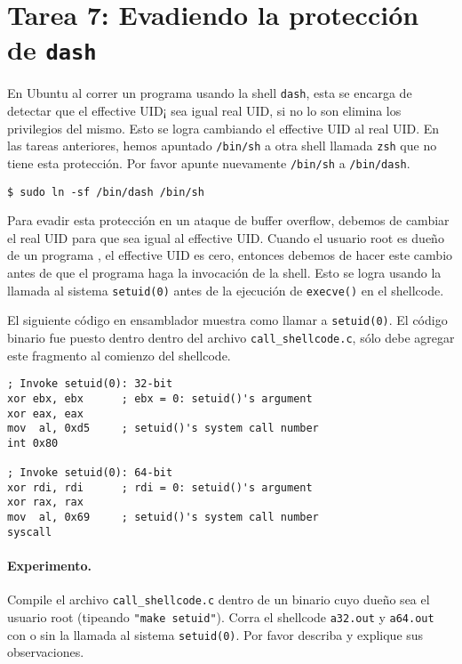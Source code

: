 \section{Tarea 7: Evadiendo la protección de \texttt{dash}}

En Ubuntu al correr un programa \setuid usando la shell \texttt{dash}, esta se encarga de detectar que el effective UID¡ sea igual real UID, si no lo son elimina los privilegios del mismo.
Esto se logra cambiando el effective UID al real UID.
En las tareas anteriores, hemos apuntado \texttt{/bin/sh} a otra shell llamada \texttt{zsh} que no tiene esta protección. Por favor apunte nuevamente \texttt{/bin/sh} a \texttt{/bin/dash}.

\begin{lstlisting}
$ sudo ln -sf /bin/dash /bin/sh
\end{lstlisting}

Para evadir esta protección en un ataque de buffer overflow, debemos de cambiar el real UID para que sea igual al effective UID. Cuando el usuario root es dueño de un programa \setuid, el effective UID es cero, entonces debemos de hacer este cambio antes de que el programa haga la invocación de la shell. Esto se logra usando la llamada al sistema \texttt{setuid(0)} antes de la ejecución de \texttt{execve()}  en el shellcode.

El siguiente código en ensamblador muestra como llamar a \texttt{setuid(0)}. El código binario fue puesto dentro dentro del archivo \texttt{call\_shellcode.c}, sólo debe agregar este fragmento al comienzo del shellcode.

\begin{lstlisting}[language={[x86masm]Assembler}]
; Invoke setuid(0): 32-bit
xor ebx, ebx      ; ebx = 0: setuid()'s argument
xor eax, eax
mov  al, 0xd5     ; setuid()'s system call number
int 0x80

; Invoke setuid(0): 64-bit
xor rdi, rdi      ; rdi = 0: setuid()'s argument
xor rax, rax       
mov  al, 0x69     ; setuid()'s system call number
syscall
\end{lstlisting}

\paragraph{Experimento.} Compile el archivo \texttt{call\_shellcode.c} dentro de un binario cuyo dueño sea el usuario root (tipeando \texttt{"make setuid"}). Corra el shellcode \texttt{a32.out} y \texttt{a64.out} con o sin la llamada al sistema \texttt{setuid(0)}. Por favor describa y explique sus observaciones.

